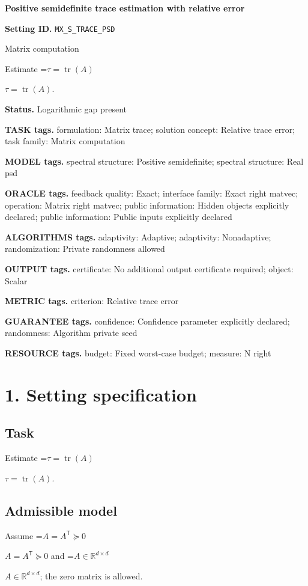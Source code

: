 \documentclass[10pt,a4paper]{article}
\newcommand{\AtlasMath}[1]{\par\begingroup\centering\setbox0=\hbox{$\displaystyle #1$}\ifdim\wd0>1.4\linewidth\typeout{ATLAS WIDE FORMULA: \the\wd0}\fi\ifdim\wd0>\linewidth\resizebox{\linewidth}{!}{\box0}\else\box0\fi\par\endgroup}
\newcommand{\AtlasInlineMath}[1]{\begingroup\setbox0=\hbox{$#1$}\ifdim\wd0>.4\linewidth\endgroup\AtlasMath{#1}\else\endgroup$#1$\fi}
\begin{document}
\raggedright

{\LARGE\bfseries\sffamily\color{AtlasNavy} Positive semidefinite trace estimation with relative error\par}\vspace{5pt}
\textbf{Setting ID.} \texttt{MX\_\allowbreak{}\allowbreak{}S\_\allowbreak{}\allowbreak{}TRACE\_\allowbreak{}\allowbreak{}PSD}

Matrix computation

Estimate \AtlasInlineMath{\tau=\operatorname{tr}(A)}.

\textbf{Status.} Logarithmic gap present

\textbf{TASK tags.} formulation: Matrix trace; solution concept: Relative trace error; task family: Matrix computation

\textbf{MODEL tags.} spectral structure: Positive semidefinite; spectral structure: Real psd

\textbf{ORACLE tags.} feedback quality: Exact; interface family: Exact right matvec; operation: Matrix right matvec; public information: Hidden objects explicitly declared; public information: Public inputs explicitly declared

\textbf{ALGORITHMS tags.} adaptivity: Adaptive; adaptivity: Nonadaptive; randomization: Private randomness allowed

\textbf{OUTPUT tags.} certificate: No additional output certificate required; object: Scalar

\textbf{METRIC tags.} criterion: Relative trace error

\textbf{GUARANTEE tags.} confidence: Confidence parameter explicitly declared; randomness: Algorithm private seed

\textbf{RESOURCE tags.} budget: Fixed worst-case budget; measure: N right

\section{1. Setting specification}
\subsection{Task}
Estimate \AtlasInlineMath{\tau=\operatorname{tr}(A)}.

\subsection{Admissible model}
Assume \AtlasInlineMath{A=A^{\mathsf T}\succeq0} and \AtlasInlineMath{A\in\mathbb{R}^{d\times d}}; the zero matrix is allowed.
\end{document}
